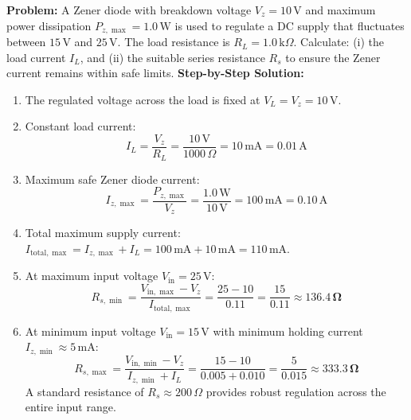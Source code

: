 \documentclass[10pt,twoside,openright]{book}
\begin{document}
\begin{usecasebox}
\textbf{Problem:} A Zener diode with breakdown voltage $V_z = 10\,\mathrm{V}$ and maximum power dissipation $P_{z,\max} = 1.0\,\mathrm{W}$ is used to regulate a DC supply that fluctuates between $15\,\mathrm{V}$ and $25\,\mathrm{V}$. The load resistance is $R_L = 1.0\,\mathrm{k}\Omega$. Calculate: (i) the load current $I_L$, and (ii) the suitable series resistance $R_s$ to ensure the Zener current remains within safe limits.
\textbf{Step-by-Step Solution:}
\begin{enumerate}
  \item The regulated voltage across the load is fixed at $V_L = V_z = 10\,\mathrm{V}$.
  \item Constant load current:
  \begin{equation}
    I_L = \frac{V_z}{R_L} = \frac{10\,\mathrm{V}}{1000\,\Omega} = 10\,\mathrm{mA} = 0.01\,\mathrm{A}
  \end{equation}
  \item Maximum safe Zener diode current:
  \begin{equation}
    I_{z,\max} = \frac{P_{z,\max}}{V_z} = \frac{1.0\,\mathrm{W}}{10\,\mathrm{V}} = 100\,\mathrm{mA} = 0.10\,\mathrm{A}
  \end{equation}
  \item Total maximum supply current: $I_{\text{total},\max} = I_{z,\max} + I_L = 100\,\mathrm{mA} + 10\,\mathrm{mA} = 110\,\mathrm{mA}$.
  \item At maximum input voltage $V_{\text{in}} = 25\,\mathrm{V}$:
  \begin{equation}
    R_{s,\min} = \frac{V_{\text{in},\max} - V_z}{I_{\text{total},\max}} = \frac{25 - 10}{0.11} = \frac{15}{0.11} \approx \mathbf{136.4\,\Omega}
  \end{equation}
  \item At minimum input voltage $V_{\text{in}} = 15\,\mathrm{V}$ with minimum holding current $I_{z,\min} \approx 5\,\mathrm{mA}$:
  \begin{equation}
    R_{s,\max} = \frac{V_{\text{in},\min} - V_z}{I_{z,\min} + I_L} = \frac{15 - 10}{0.005 + 0.010} = \frac{5}{0.015} \approx \mathbf{333.3\,\Omega}
  \end{equation}
  A standard resistance of $R_s \approx 200\,\Omega$ provides robust regulation across the entire input range.
\end{enumerate}
\end{usecasebox}
\end{document}
